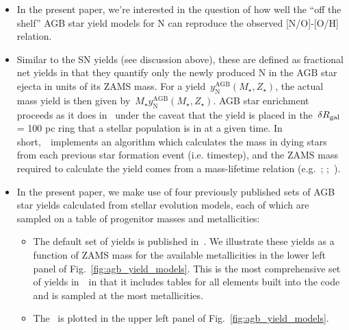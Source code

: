 \documentclass[ms.tex]{subfiles}
\begin{document}
\begin{itemize} 
	\item In the present paper, we're interested in the question of how 
	well the ``off the shelf'' AGB star yield models for N can reproduce the 
	observed [N/O]-[O/H] relation. 


	\item Similar to the SN yields (see discussion above), these are defined as 
	fractional net yields in that they quantify only the newly produced N in 
	the AGB star ejecta in units of its ZAMS mass. 
	For a yield~$y_\text{N}^\text{AGB}(M_\star, Z_\star)$, the actual mass 
	yield is then given by~$M_\star y_\text{N}^\text{AGB}(M_\star, Z_\star)$. 
	AGB star enrichment proceeds as it does in~\citet{Johnson2020} under the 
	caveat that the yield is placed in the~$\delta R_\text{gal}$ = 100 pc ring that a 
	stellar population is in at a given time. 
	In short,~\vice~implements an algorithm which calculates the mass in dying 
	stars from each previous star formation event (i.e. timestep), and the ZAMS 
	mass required to calculate the yield comes from a mass-lifetime 
	relation (e.g.~\citealp{Larson1974, Maeder1989, Padovani1993, Kodama1997}; 
	\citealp*{Hurley2000};~\citealp{Vincenzo2016b}). 

	\item In the present paper, we make use of four previously published sets 
	of AGB star yields calculated from stellar evolution models, each of which 
	are sampled on a table of progenitor masses and metallicities: 

	\begin{itemize} 
		\item The default set of yields is published 
		in~\citet[][hereafter~\cristallo]{Cristallo2011, Cristallo2015}. 
		We illustrate these yields as a function of ZAMS mass for the available 
		metallicities in the lower left panel of 
		Fig.~\ref{fig:agb_yield_models}. 
		This is the most comprehensive set of yields in~\vice~in that it 
		includes tables for all elements built into the code and is sampled at 
		the most metallicities.  

		\item The~\citet[][hereafter~\karakasten]{Karakas2010} is plotted in 
		the upper left panel of Fig.~\ref{fig:agb_yield_models}. 


\end{itemize}
\end{itemize}
\end{document}
